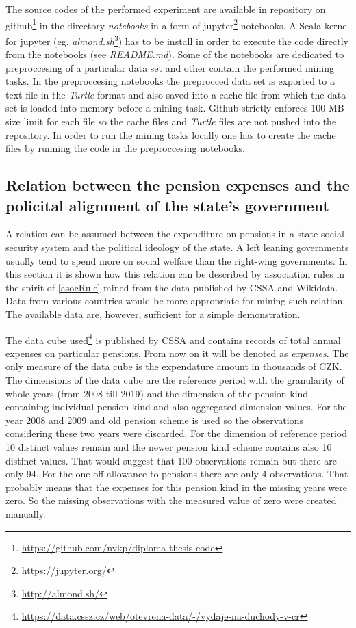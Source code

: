 The source codes of the performed experiment are available in repository on github\footnote{\href{https://github.com/nvkp/diploma-thesis-code}{https://github.com/nvkp/diploma-thesis-code}} in the directory \textit{notebooks} in a form of jupyter\footnote{\href{https://jupyter.org/}{https://jupyter.org/}} notebooks. A Scala kernel for jupyter (eg. \textit{almond.sh}\footnote{\href{http://almond.sh/}{http://almond.sh/}}) has to be install in order to execute the code directly from the notebooks (see \textit{README.md}). Some of the notebooks are dedicated to preproccesing of a particular data set and other contain the performed mining tasks. In the preproccesing notebooks the preprocced data set is exported to a text file in the \textit{Turtle} format and also saved into a cache file from which the data set is loaded into memory before a mining task.  Github strictly enforces 100 MB size limit for each file so the cache files and \textit{Turtle} files are not pushed into the repository. In order to run the mining tasks locally one has to create the cache files by running the code in the preproccesing notebooks.

\subsection{Relation between the pension expenses and the policital alignment of the state's government\label{expenses-wikidata}}

A relation can be assumed between the expenditure on pensions in a state social security system and the political ideology of the state. A left leaning governments usually tend to spend more on social welfare than the right-wing governments. In this section it is shown how this relation can be described by association rules in the spirit of \ref{asocRule} mined from the data published by CSSA and Wikidata. Data from various countries would be more appropriate for mining such relation. The available data are, however, sufficient for a simple demonstration. 

The data cube used\footnote{\href{https://data.cssz.cz/web/otevrena-data/-/vydaje-na-duchody-v-cr}{https://data.cssz.cz/web/otevrena-data/-/vydaje-na-duchody-v-cr}} is published by CSSA and contains records of total annual expenses on particular pensions. From now on it will be denoted as \textit{expenses}. The only measure of the data cube is the expendature amount in thousands of CZK. The dimensions of the data cube are the reference period with the granularity of whole years (from 2008 till 2019) and the dimension of the pension kind containing individual pension kind and also aggregated dimension values. For the year 2008 and 2009 and old pension scheme is used so the observations considering these two years were discarded. For the dimension of reference period 10 distinct values remain and the newer pension kind scheme contains also 10 distinct values. That would suggest that 100 observations remain but there are only 94. For the one-off allowance to pensions there are only 4 observations. That probably means that the expenses for this pension kind in the missing years were zero. So the missing observations with the measured value of zero were created manually.

